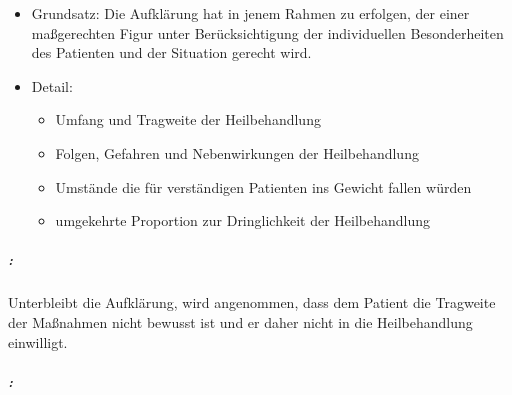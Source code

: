 \begin{itemize}
	\item 	Grundsatz: Die Aufklärung hat in jenem Rahmen zu erfolgen, der einer
	ma{\ss}gerechten Figur unter Ber\"ucksichtigung der individuellen
	Besonderheiten des Patienten und der Situation gerecht
	wird.

	\item Detail:
	

	\begin{itemize}
	
		\item Umfang und Tragweite der  Heilbehandlung 
		\item Folgen, Gefahren und Nebenwirkungen der
		 Heilbehandlung 
		\item Umstände die f\"ur verständigen Patienten ins
		Gewicht fallen w\"urden

		\item umgekehrte Proportion zur Dringlichkeit der
		 Heilbehandlung 

	\end{itemize}
\end{itemize}

\subparagraph*{:}
Unterbleibt die Aufklärung, wird angenommen, dass dem
Patient die Tragweite der Ma{\ss}nahmen nicht bewusst ist und er daher nicht in die
Heilbehandlung einwilligt. 

\subparagraph*{:}

